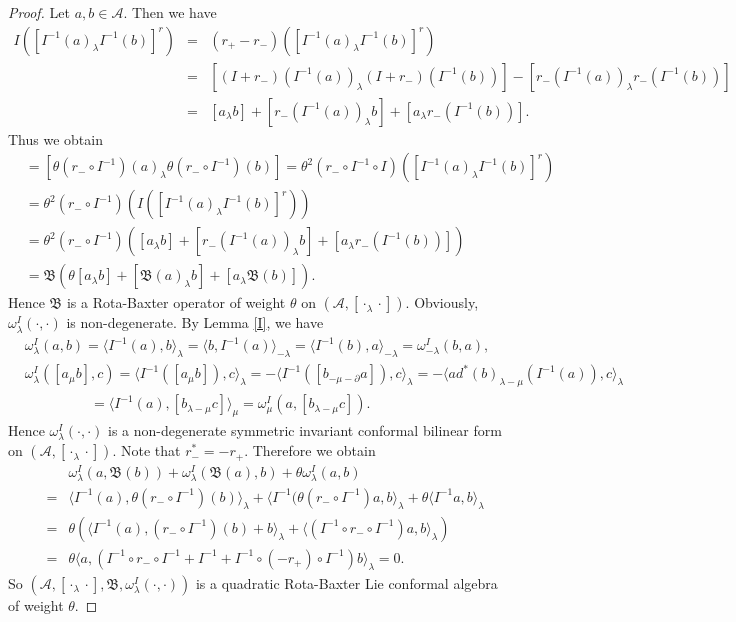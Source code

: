 \documentclass[10pt,a4paper]{amsart}
\newcommand{\A}{\mathcal{A}}
\theoremstyle{plain}
\theoremstyle{definition}
\begin{document}
\begin{proof}
Let $a,b\in \A$. Then we have
\begin{eqnarray}
    I([I^{-1}(a)_\lambda I^{-1}(b)]^r)&=&(r_+-r_-)([I^{-1}(a)_\lambda I^{-1}(b)]^r)\label{eq-q1}\\
    &=&[(I+r_-)(I^{-1}(a))_\lambda (I+r_-)(I^{-1}(b)) ]-[r_-(I^{-1}(a))_\lambda r_-(I^{-1}(b))]\nonumber\\
    &=&[a_\lambda b]+[r_-(I^{-1}(a))_\lambda b]+[a_\lambda r_-(I^{-1}(b))].\nonumber
\end{eqnarray}
Thus we obtain
\begin{align*}
    [\mathfrak{B}(a)_\lambda \mathfrak{B}(b)]&=[\theta (r_-\circ I^{-1})(a)_\lambda \theta (r_-\circ I^{-1})(b) ]
    =\theta^2 (r_-\circ I^{-1}\circ I)([I^{-1}(a)_\lambda  I^{-1} (b)]^r)\\
    &=\theta^2 (r_-\circ I^{-1})(I([I^{-1}(a)_\lambda  I^{-1} (b)]^r))\\
    &=\theta^2 (r_-\circ I^{-1})([a_\lambda b]+[r_-(I^{-1}(a))_\lambda b]+[a_\lambda r_-(I^{-1}(b))])\\
    &=\mathfrak{B}(\theta[a_\lambda b]+[\mathfrak{B}(a)_\lambda b]+[a_\lambda
    \mathfrak{B}(b)]).
\end{align*}
Hence $\mathfrak{B}$ is a Rota-Baxter operator of weight $\theta$
on $(\A,[\cdot_\lambda \cdot])$. Obviously,
$\omega^I_\lambda(\cdot,\cdot)$ is non-degenerate. By Lemma
\ref{I}, we have
\begin{align*}
    &\omega_\lambda^I(a,b)=\langle I^{-1}(a),b\rangle_\lambda=\langle b,I^{-1}(a)\rangle_{-\lambda}=\langle I^{-1}(b),a\rangle_{-\lambda}
    =\omega_{-\lambda}^I(b,a),\\
    &\omega_{\lambda}^I([a_\mu b],c)=\langle I^{-1}([a_\mu b]),c\rangle_\lambda=-\langle I^{-1}([b_{-\mu-\partial} a]),c\rangle_\lambda =-\langle ad^* (b)_{\lambda-\mu}(I^{-1}(a)),c\rangle_\lambda\\
    &\qquad\qquad\,\,\,\,=\langle I^{-1}(a),[b_{\lambda-\mu}c]\rangle_\mu=\omega_\mu^I(a,[b_{\lambda-\mu
    }c]).
\end{align*}
Hence $\omega^I_\lambda(\cdot,\cdot) $ is a non-degenerate symmetric invariant
conformal bilinear form on $(\A,[\cdot_\lambda\cdot])$. Note that
$r_-^\ast=-r_+$. Therefore we obtain
\begin{eqnarray*}
    &&\omega_{\lambda}^I(a,\mathfrak{B}(b))+\omega_{\lambda}^I(\mathfrak{B}(a),b)+\theta\omega_{\lambda}^I(a,b)\\
    &=&\langle I^{-1} (a),\theta (r_-\circ I^{-1})(b)\rangle_\lambda +\langle I^{-1}(\theta (r_-\circ I^{-1})a,b\rangle_\lambda +\theta\langle I^{-1}a,b\rangle_\lambda\\
    &=&\theta( \langle I^{-1}(a),(r_-\circ I^{-1})(b)+b\rangle_\lambda+\langle (I^{-1}\circ r_-\circ I^{-1})a,b\rangle_\lambda)\\
    &=&\theta\langle a,(I^{-1}\circ r_-\circ I^{-1}+I^{-1}+I^{-1}\circ (-r_+)\circ I^{-1})b\rangle_\lambda=0.
\end{eqnarray*}
So
$(\A,[\cdot_\lambda\cdot],\mathfrak{B},\omega^I_\lambda(\cdot,\cdot))$
is a quadratic    Rota-Baxter Lie conformal
algebra of weight  $\theta$.
\end{proof}
\end{document}
